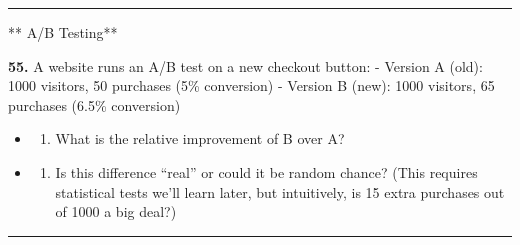 \documentclass[
  11pt,
]{article}
\providecommand{\tightlist}{%
  \setlength{\itemsep}{0pt}\setlength{\parskip}{0pt}}
\begin{document}
\begin{center}\rule{0.5\linewidth}{0.5pt}\end{center}

** A/B Testing**

\textbf{55.} A website runs an A/B test on a new checkout button: -
Version A (old): 1000 visitors, 50 purchases (5\% conversion) - Version
B (new): 1000 visitors, 65 purchases (6.5\% conversion)

\begin{itemize}
\item
  \begin{enumerate}
  \def\labelenumi{(\alph{enumi})}
  \tightlist
  \item
    What is the relative improvement of B over A?
  \end{enumerate}
\item
  \begin{enumerate}
  \def\labelenumi{(\alph{enumi})}
  \setcounter{enumi}{1}
  \tightlist
  \item
    Is this difference ``real'' or could it be random chance? (This
    requires statistical tests we'll learn later, but intuitively, is 15
    extra purchases out of 1000 a big deal?)
  \end{enumerate}
\end{itemize}

\begin{center}\rule{0.5\linewidth}{0.5pt}\end{center}
\end{document}
